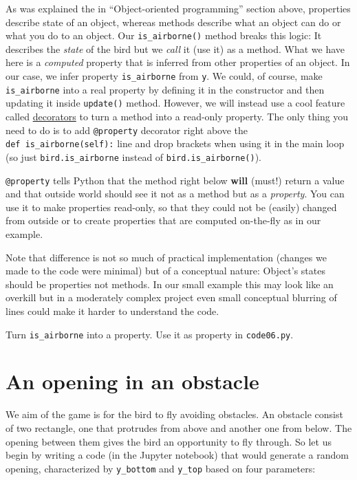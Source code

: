 \documentclass[
]{book}
\begin{document}
As was explained the in ``Object-oriented programming'' section above, properties describe state of an object, whereas methods describe what an object can do or what you do to an object. Our \texttt{is\_airborne()} method breaks this logic: It describes the \emph{state} of the bird but we \emph{call} it (use it) as a method. What we have here is a \emph{computed} property that is inferred from other properties of an object. In our case, we infer property \texttt{is\_airborne} from \texttt{y}. We could, of course, make \texttt{is\_airborne} into a real property by defining it in the constructor and then updating it inside \texttt{update()} method. However, we will instead use a cool feature called \href{https://www.python.org/dev/peps/pep-0318/}{decorators} to turn a method into a read-only property. The only thing you need to do is to add \texttt{@property} decorator right above the \texttt{def\ is\_airborne(self):} line and drop brackets when using it in the main loop (so just \texttt{bird.is\_airborne} instead of \texttt{bird.is\_airborne()}).

\texttt{@property} tells Python that the method right below \textbf{will} (must!) return a value and that outside world should see it not as a method but as a \emph{property}. You can use it to make properties read-only, so that they could not be (easily) changed from outside or to create properties that are computed on-the-fly as in our example.

Note that difference is not so much of practical implementation (changes we made to the code were minimal) but of a conceptual nature: Object's states should be properties not methods. In our small example this may look like an overkill but in a moderately complex project even small conceptual blurring of lines could make it harder to understand the code.

Turn \texttt{is\_airborne} into a property.
Use it as property in \texttt{code06.py}.

\hypertarget{an-opening-in-an-obstacle}{%
\section{An opening in an obstacle}\label{an-opening-in-an-obstacle}}

We aim of the game is for the bird to fly avoiding obstacles. An obstacle consist of two rectangle, one that protrudes from above and another one from below. The opening between them gives the bird an opportunity to fly through. So let us begin by writing a code (in the Jupyter notebook) that would generate a random opening, characterized by \texttt{y\_bottom} and \texttt{y\_top} based on four parameters:
\end{document}
